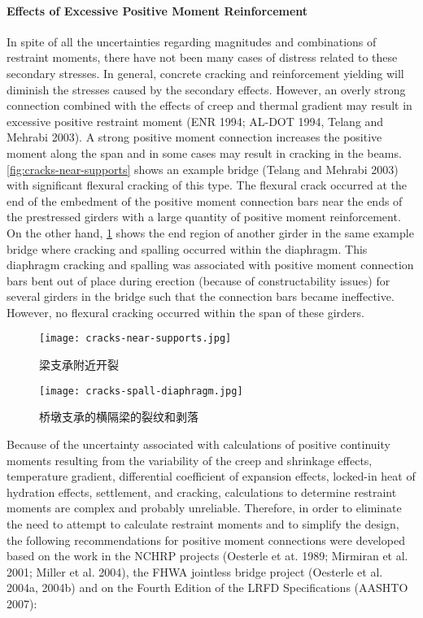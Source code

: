 \paragraph*{Effects of Excessive Positive Moment Reinforcement}
In spite of all the uncertainties regarding magnitudes and combinations of restraint moments, there have not been many cases of distress related to these secondary stresses. In general, concrete cracking and reinforcement yielding will diminish the stresses caused by the secondary effects. However, an overly strong connection combined with the effects of creep and thermal gradient may result in excessive positive restraint moment (ENR 1994; AL-DOT 1994, Telang and Mehrabi 2003). A strong positive moment connection increases the positive moment along the span and in some cases may result in cracking in the beams. \cref{fig:cracks-near-supports} shows an example bridge (Telang and Mehrabi 2003) with significant flexural cracking of this type. The flexural crack occurred at the end of the embedment of the positive moment connection bars near the ends of the prestressed girders with a large quantity of positive moment reinforcement. On the other hand, \cref{fig:cracks-spall-diaphragm} shows the end region of another girder in the same example bridge where cracking and spalling occurred within the diaphragm. This diaphragm cracking and spalling was associated with positive moment connection bars bent out of place during erection (because of constructability issues) for several girders in the bridge such that the connection bars became ineffective. However, no flexural cracking occurred within the span of these girders.

\begin{figure}
  \begin{minipage}{0.5\linewidth}\centering
    \texttt{[image: cracks-near-supports.jpg]}
    \caption{梁支承附近开裂}
    \label{fig:cracks-near-supports}
  \end{minipage}%
  \begin{minipage}{0.5\linewidth}\centering
    \texttt{[image: cracks-spall-diaphragm.jpg]}
    \caption{桥墩支承的横隔梁的裂纹和剥落}
    \label{fig:cracks-spall-diaphragm}
  \end{minipage}
\end{figure}

\bigskip 
Because of the uncertainty associated with calculations of positive continuity moments resulting from the variability of the creep and shrinkage effects, temperature gradient, differential coefficient of expansion effects, locked-in heat of hydration effects, settlement, and cracking, calculations to determine restraint moments are complex and probably unreliable. Therefore, in order to eliminate the need to attempt to calculate restraint moments and to simplify the design, the following recommendations for positive moment connections were developed based on the work in the NCHRP projects (Oesterle et at. 1989; Mirmiran et al. 2001; Miller et al. 2004), the FHWA jointless bridge project (Oesterle et al. 2004a, 2004b) and on the Fourth Edition of the LRFD Specifications (AASHTO 2007):

